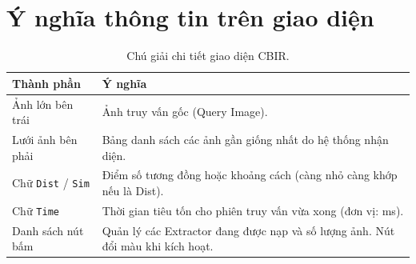 \section{Ý nghĩa thông tin trên giao diện}
\begin{table}[H]
\centering
\begin{tabularx}{\textwidth}{|l|X|}
\hline
\textbf{Thành phần} & \textbf{Ý nghĩa} \\
\hline
Ảnh lớn bên trái & Ảnh truy vấn gốc (Query Image). \\
\hline
Lưới ảnh bên phải & Bảng danh sách các ảnh gần giống nhất do hệ thống nhận diện. \\
\hline
Chữ \texttt{Dist} / \texttt{Sim} & Điểm số tương đồng hoặc khoảng cách (càng nhỏ càng khớp nếu là Dist). \\
\hline
Chữ \texttt{Time} & Thời gian tiêu tốn cho phiên truy vấn vừa xong (đơn vị: ms). \\
\hline
Danh sách nút bấm & Quản lý các Extractor đang được nạp và số lượng ảnh. Nút đổi màu khi kích hoạt. \\
\hline
\end{tabularx}
\caption{Chú giải chi tiết giao diện CBIR.}
\end{table}
